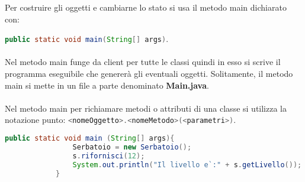 \documentclass{subfile}
\begin{document}
Per costruire gli oggetti e cambiarne lo stato si usa il metodo main dichiarato con:

\lstinline[language = java]{public static void main(String[] args)}.\\\\
Nel metodo main funge da client per tutte le classi quindi in esso si scrive il programma eseguibile che genererà gli
eventuali oggetti. Solitamente, il metodo main si mette in un file a parte denominato \textbf{Main.java}.\\\\
Nel metodo main per richiamare metodi o attributi di una classe si utilizza la notazione punto:
\lstinline[language = java]{<nomeOggetto>.<nomeMetodo>(<parametri>)}.\\
\begin{Example*}
    \item []
    \begin{center}
        \begin{lstlisting}[style = general, language = java]
            public static void main (String[] args){
                Serbatoio = new Serbatoio();
                s.rifornisci(12);
                System.out.println("Il livello e`:" + s.getLivello());
            }
        \end{lstlisting}
    \end{center}
\end{Example*}
\clearpage
\end{document}
